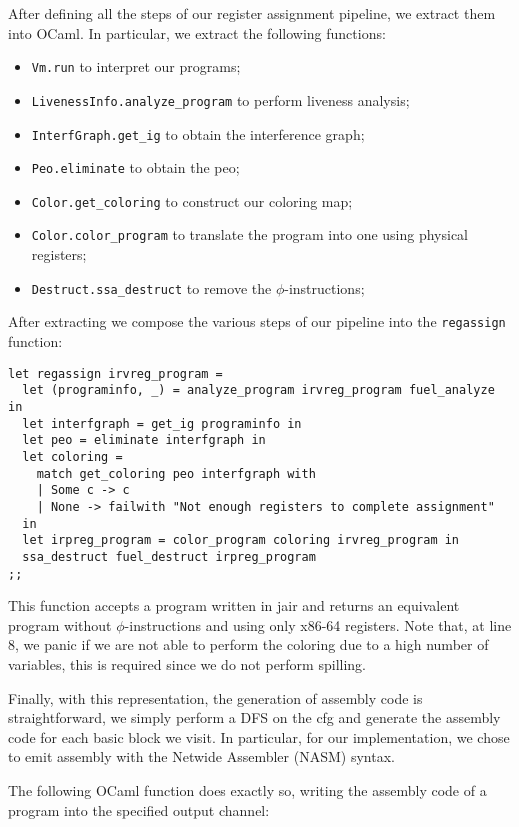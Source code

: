 After defining all the steps of our register assignment pipeline, we extract them into OCaml.
In particular, we extract the following functions:
\begin{itemize}
  \item \texttt{Vm.run} to interpret our programs;
  \item \texttt{LivenessInfo.analyze\_program} to perform liveness analysis;
  \item \texttt{InterfGraph.get\_ig} to obtain the interference graph;
  \item \texttt{Peo.eliminate} to obtain the \gls{peo};
  \item \texttt{Color.get\_coloring} to construct our coloring map;
  \item \texttt{Color.color\_program} to translate the program into one using physical registers;
  \item \texttt{Destruct.ssa\_destruct} to remove the $\phi$-instructions;
\end{itemize}

After extracting we compose the various steps of our pipeline into the \texttt{regassign} function:

\begin{lstlisting}[style=OCaml]
let regassign irvreg_program =
  let (programinfo, _) = analyze_program irvreg_program fuel_analyze in
  let interfgraph = get_ig programinfo in
  let peo = eliminate interfgraph in
  let coloring =
    match get_coloring peo interfgraph with
    | Some c -> c
    | None -> failwith "Not enough registers to complete assignment"
  in
  let irpreg_program = color_program coloring irvreg_program in
  ssa_destruct fuel_destruct irpreg_program
;;
\end{lstlisting}

This function accepts a program written in \gls{jair} and returns an equivalent program without $\phi$-instructions and using only x86-64 registers.
Note that, at line 8, we panic if we are not able to perform the coloring due to a high number of variables, this is required since we do not perform spilling.

Finally, with this representation, the generation of assembly code is straightforward, we simply perform a DFS on the \gls{cfg} and generate the assembly code for each basic block we visit.
In particular, for our implementation, we chose to emit assembly with the Netwide Assembler (NASM) syntax.

The following OCaml function does exactly so, writing the assembly code of a program into the specified output channel:

